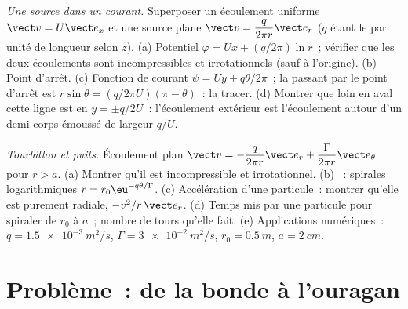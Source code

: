 \begin{exercise}[$\star\star\star$]\label{exo:b2:fluid-kinematics:11}
\emph{Une source dans un courant.} Superposer un écoulement uniforme $\vect v = U\vect e_x$
et une source plane $\vect v = \dfrac{q}{2\pi r}\vect e_r$ ($q$ étant le  par unité de longueur selon $z$). (a) Potentiel $\varphi = Ux +
(q/2\pi)\ln r$~; vérifier que les deux écoulements sont incompressibles et irrotationnels
(sauf à l'origine). (b) Point d'arrêt. (c) Fonction de courant $\psi
= Uy + q\theta/2\pi$~; la  passant par le point d'arrêt est
$r\sin\theta = (q/2\pi U)(\pi - \theta)$~: la tracer. (d) Montrer que loin en
aval cette ligne est en $y = \pm q/2U$~: l'écoulement extérieur est
l'écoulement autour d'un demi-corps émoussé de largeur $q/U$.
\end{exercise}

\begin{exercise}[$\star\star\star$]\label{exo:b2:fluid-kinematics:12}
\emph{Tourbillon et puits.} Écoulement plan $\vect v = -\dfrac{q}{2\pi r}\vect e_r +
\dfrac{\Gamma}{2\pi r}\vect e_\theta$ pour $r > a$. (a) Montrer qu'il est
incompressible et irrotationnel. (b) ~: spirales logarithmiques
$r = r_0\eu^{-q\theta/\Gamma}$. (c) Accélération d'une particule~: montrer qu'elle est
purement radiale, $-v^2/r\,\vect e_r$. (d) Temps mis par une particule pour spiraler
de $r_0$ à $a$~; nombre de tours qu'elle fait. (e) Applications numériques~: $q =
\qty{1.5e-3}{m^2/s}$, $\Gamma = \qty{3e-2}{m^2/s}$, $r_0 = \qty{0.5}{m}$,
$a = \qty{2}{cm}$.
\end{exercise}

\section{Problème~: de la bonde à l'ouragan}

